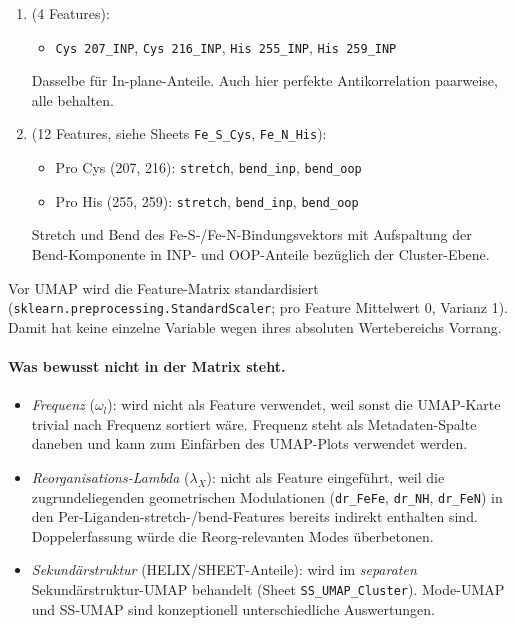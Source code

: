 \documentclass[11pt,a4paper,twoside]{article}
\theoremstyle{remark}
\begin{document}
\begin{enumerate}
  \item[\textbf{Liganden INP-Anteile}] (4 Features):
        \begin{itemize}\setlength{\itemsep}{0pt}
          \item \texttt{Cys 207\_INP}, \texttt{Cys 216\_INP},
                \texttt{His 255\_INP}, \texttt{His 259\_INP}
        \end{itemize}
        Dasselbe f\"ur In-plane-Anteile. Auch hier perfekte
        Antikorrelation paarweise, alle behalten.

  \item[\textbf{Pro-Liganden-Atom-Bewegungen}] (12 Features, siehe
        Sheets \texttt{Fe\_S\_Cys}, \texttt{Fe\_N\_His}):
        \begin{itemize}\setlength{\itemsep}{0pt}
          \item Pro Cys (207, 216): \texttt{stretch},
                \texttt{bend\_inp}, \texttt{bend\_oop}
          \item Pro His (255, 259): \texttt{stretch},
                \texttt{bend\_inp}, \texttt{bend\_oop}
        \end{itemize}
        Stretch und Bend des Fe-S-/Fe-N-Bindungsvektors mit
        Aufspaltung der Bend-Komponente in INP- und OOP-Anteile
        bez\"uglich der Cluster-Ebene.
\end{enumerate}

Vor UMAP wird die Feature-Matrix standardisiert
(\texttt{sklearn.preprocessing.StandardScaler}; pro Feature Mittelwert
0, Varianz 1). Damit hat keine einzelne Variable wegen ihres
absoluten Wertebereichs Vorrang.

\paragraph{Was bewusst nicht in der Matrix steht.}

\begin{itemize}
  \item \emph{Frequenz} ($\omega_l$): wird nicht als Feature
        verwendet, weil sonst die UMAP-Karte trivial nach Frequenz
        sortiert w\"are. Frequenz steht als Metadaten-Spalte daneben
        und kann zum Einf\"arben des UMAP-Plots verwendet werden.

  \item \emph{Reorganisations-Lambda} ($\lambda_X$): nicht als Feature
        eingef\"uhrt, weil die zugrundeliegenden geometrischen
        Modulationen (\texttt{dr\_FeFe}, \texttt{dr\_NH},
        \texttt{dr\_FeN}) in den Per-Liganden-stretch-/bend-Features
        bereits indirekt enthalten sind. Doppelerfassung w\"urde die
        Reorg-relevanten Modes \"uberbetonen.

  \item \emph{Sekund\"arstruktur} (HELIX/SHEET-Anteile): wird im
        \emph{separaten} Sekund\"arstruktur-UMAP behandelt
        (Sheet \texttt{SS\_UMAP\_Cluster}). Mode-UMAP und
        SS-UMAP sind konzeptionell unterschiedliche Auswertungen.
\end{itemize}
\end{document}
